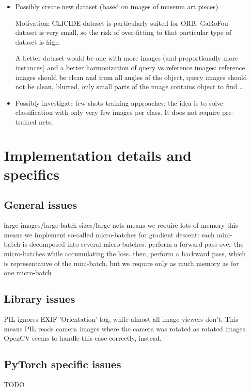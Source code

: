 \documentclass[fleqn]{article}
\begin{document}
\begin{itemize}
    \item Possibly create new dataset
    (based on images of museum art pieces)

    Motivation: CLICIDE dataset is particularly suited for ORB.
    GaRoFou dataset is very small, so the risk of over-fitting
    to that particular type of dataset is high.

    A better dataset would be one with more images
    (and proportionally more instances) and a better harmonization of
    query vs reference images: reference images should be clean and from
    all angles of the object, query images should not be clean, blurred,
    only small parts of the image contains object to find \dots
    \item Possibly investigate few-shots training approaches:
    the idea is to solve classification with only very few images per class.
    It does not require pre-trained nets.
\end{itemize}




\newpage
\appendix
\section{Implementation details and specifics}
\subsection{General issues}
large images/large batch sizes/large nets means we require lots of memory
this means we implement so-called micro-batches for gradient descent:
each mini-batch is decomposed into several micro-batches.
perform a forward pass over the micro-batches while accumulating the loss.
then, perform a backward pass, which is representative of the mini-batch,
but we require only as much memory as for one micro-batch

\subsection{Library issues}
PIL ignores EXIF 'Orientation' tag, while almost all image viewers don't.
This means PIL reads camera images where the camera was rotated as rotated
images. OpenCV seems to handle this case correctly, instead.

\subsection{PyTorch specific issues}
TODO
\end{document}
